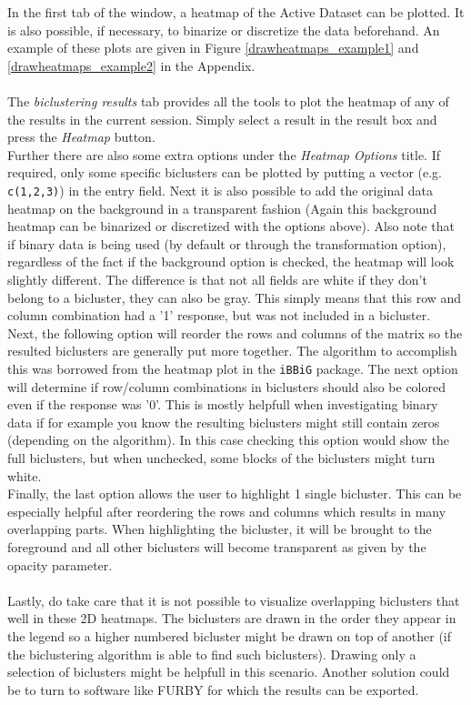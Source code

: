 \documentclass[a4paper]{article}\usepackage[]{graphicx}\usepackage[]{color}
\begin{document}
\noindent In the first tab of the window, a heatmap of the Active Dataset can be
plotted. It is also possible, if necessary, to binarize or discretize the data
beforehand. An example of these plots are given in Figure
\ref{drawheatmaps_example1} and \ref{drawheatmaps_example2} in the Appendix.
\\ \\
\noindent The {\it biclustering results} tab provides all the tools to plot the
heatmap of any of the results in the current session. Simply select a result in
the result box and press the {\it Heatmap} button. \\
Further there are also some extra options under the {\it Heatmap Options} title.
If required, only some specific biclusters can be plotted by putting a vector
(e.g. \verb|c(1,2,3)|) in the entry field. Next it is also possible to add the
original data heatmap on the background in a transparent fashion (Again this
background heatmap can be binarized or discretized with the options above).
Also note that if binary data is being used (by default or through the
transformation option), regardless of the fact if the background option is
checked, the heatmap will look slightly different. The difference is that not
all fields are white if they don't belong to a bicluster, they can also be gray.
This simply means that this row and column combination had a '1' response, but
was not included in a bicluster.\\
Next, the following option will reorder the rows and columns of the matrix so
the resulted biclusters are generally put more together. The algorithm to
accomplish this was borrowed from the heatmap plot in the \verb|iBBiG| package.
The next option will determine if row/column combinations in biclusters should
also be colored even if the response was '0'. This is mostly helpfull when investigating binary data if for example you know the resulting biclusters might still
contain zeros (depending on the algorithm). In this case checking this option would show
the full biclusters, but when unchecked, some blocks of the biclusters might
turn white.\\
\noindent Finally, the last option allows the user to highlight 1 single
bicluster. This can be especially helpful after reordering the rows and columns
which results in many overlapping parts. When highlighting the bicluster, it will be brought to
the foreground and all other biclusters will become transparent as given by the
opacity parameter.
\\ \\
Lastly, do take care that it is not possible to visualize overlapping biclusters
that well in these 2D heatmaps. The biclusters are drawn in the order they
appear in the legend so a higher numbered bicluster might be drawn on top of
another (if the biclustering algorithm is able to find such biclusters). Drawing only a
selection of biclusters might be helpfull in this
scenario. Another solution could be to turn to software like FURBY
for which the results can be exported.
\end{document}
